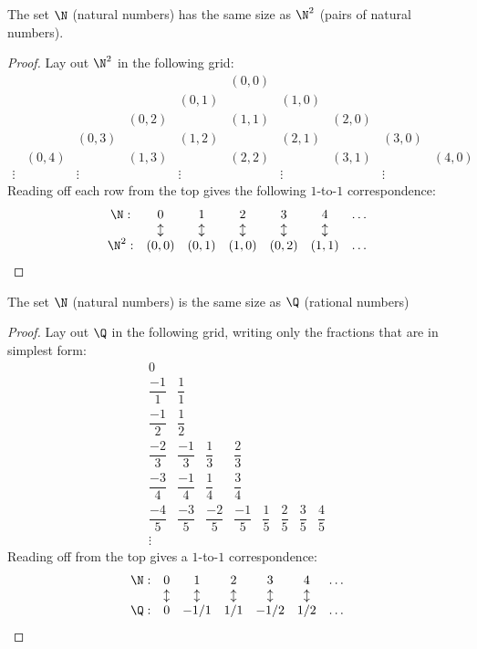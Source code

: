 \message{ !name(truth.tex)}\documentclass{scrbook}
\begin{document}
\begin{theorem}
  The set $\N$ (natural numbers) has the same size as $\N^2$ (pairs of natural numbers). 
\end{theorem}
\begin{proof}
  Lay out $\N^2$ in the following grid: 
  \[
  \begin{matrix}
    &&&&& (0,0)  \\
    &&&&(0,1)& & (1,0) \\
    &&&(0,2) && (1,1) && (2,0)  \\
    &&(0,3) && (1,2) && (2,1)&& (3,0) \\
    &(0,4) && (1,3) && (2,2) && (3,1) && (4,0) \\
    \vdots && \vdots && \vdots && \vdots && \vdots  
  \end{matrix}
  \]
  Reading off each row from the top gives the following $1$-to-$1$ correspondence:
  \[
  \begin{matrix}
    \N:& 0 & 1 & 2 & 3 & 4 & \dots \\
       & \updownarrow & \updownarrow& \updownarrow&\updownarrow&\updownarrow & \\
    \N^2:& (0,0) & (0,1) & (1,0) & (0,2) & (1,1) & \dots 
  \end{matrix}
  \]
\end{proof}

\begin{theorem}
  The set $\N$ (natural numbers) is the same size as $\Q$ (rational numbers)\label{th:q-countable}
\end{theorem}
\begin{proof}
  Lay out $\Q$ in the following grid, writing only the fractions that are in simplest form: 
  \begingroup
  \renewcommand*{\arraystretch}{2.2}
  \[
  \begin{matrix}
    0 \\
    \dfrac{-1}{1} & \dfrac 11\\
    \dfrac{-1}{2} & \dfrac{1}{2}\\
    \dfrac{-2}{3} & \dfrac{-1}3 & \dfrac 1 3 & \dfrac 2 3 \\
    \dfrac{-3}4 & \dfrac{-1}4 & \dfrac 1 4 & \dfrac 3 4 \\
    \dfrac{-4}5 & \dfrac {-3}5 & \dfrac {-2}5 & \dfrac {-1}5 & \dfrac 15 &\dfrac 25& \dfrac 35& \dfrac 45 \\
    \vdots 
  \end{matrix}
  \]
  \endgroup
  Reading off from the top gives a $1$-to-$1$ correspondence: 
  \[
  \begin{matrix}
    \N:& 0 & 1 & 2 & 3 & 4 & \dots \\
       & \updownarrow & \updownarrow& \updownarrow&\updownarrow&\updownarrow & \\
    \Q:& 0 & -1/1 & 1/1 & -1/2& 1/2 & \dots 
  \end{matrix}
  \]
\end{proof}
\end{document}
